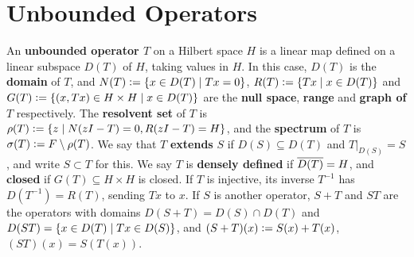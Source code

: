 \documentclass[10pt]{amsart}
\begin{document}

\section{Unbounded Operators}
An \textbf{unbounded operator $T$} on a Hilbert space $H$ is a linear map defined on a linear subspace $D(T)$ of $H$, taking values in $H$. In this case, $D(T)$ is the \textbf{domain} of $T$, and $N(T) \vcentcolon= \left\{  x \in D(T) \mid Tx = 0  \right\}$, $R(T) \vcentcolon= \left\{  Tx \mid x \in D(T)  \right\}$ and $G(T) \vcentcolon= \left\{  (x, Tx) \in H \times H \mid x \in D(T)  \right\}$ are the \textbf{null space}, \textbf{range} and \textbf{graph of $T$} respectively. The \textbf{resolvent set} of $T$ is $\rho(T) \vcentcolon= \left\{  z \mid N(zI - T) = 0, R(zI - T) = H  \right\}$, and the \textbf{spectrum} of $T$ is $\sigma(T) \vcentcolon= F \setminus \rho(T)$. We say that $T$ \textbf{extends} $S$ if $D(S) \subseteq D(T)$ and $T|_{D(S)} = S$, and write $S \subset T$ for this. We say $T$ is \textbf{densely defined} if $\overline{D(T)} = H$, and \textbf{closed} if $G(T) \subseteq H \times H$ is closed. If $T$ is injective, its inverse $T^{-1}$ has $D(T^{-1}) = R(T)$, sending $Tx$ to $x$. If $S$ is another operator, $S + T$ and $ST$ are the operators with domains $D(S + T) = D(S) \cap D(T)$ and $D(ST) = \left\{  x \in D(T) \mid Tx \in D(S)  \right\}$, and $(S + T)(x) \vcentcolon= S(x) + T(x)$, $(ST)(x) = S(T(x))$.
\end{document}
